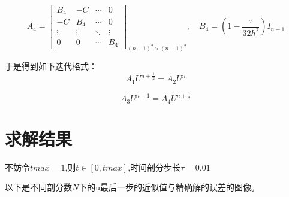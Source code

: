 \documentclass[12pt,a4paper]{article}
\begin{document}
\begin{equation}
A_4 = \left[                 
\begin{array}{cccc}
B_4& -C &\cdots  & 0\\
-C& B_4 &\cdots& 0\\
\vdots  & \vdots & \ddots & \vdots \\
0& 0 &\cdots  &B_4
\end{array}
\right ]_{(n-1)^2 \times (n-1)^2},\quad
B_4 =(1-\frac{\tau}{32h^2}) I_{n-1}  
\end{equation}

于是得到如下迭代格式：
$$A_1 U^{n+\frac{1}{2}} = A_2 U^{n} $$

$$A_3 U^{n+1} = A_4 U^{n+\frac{1}{2}} $$
\section{求解结果}
不妨令$tmax = 1$,则$t \in [0,tmax]$,时间剖分步长$\tau = 0.01$

以下是不同剖分数$N$下的u最后一步的近似值与精确解的误差的图像。
\end{document}
